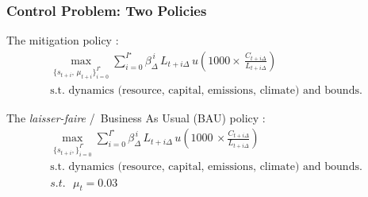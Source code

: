 \documentclass[xcolor=x11names,compress,aspectratio=169]{beamer}%
\makeatletter
\renewenvironment{itemize}{\begin{compactitemize}[<+-| alert@+>]}{\end{compactitemize}}
\makeatother
\begin{document}
\begin{frame}%
%

\frametitle{Control Problem: Two Policies}%


\begin{itemize}
\item The
\color{green}%
mitigation policy%
\color{black}%
:%
\begin{gather*}
\max_{\{s_{t+i},\,\mu_{t+i}\}_{i=0}^{I^{\star}}}\sum\nolimits_{i=0}^{I^{\star
}}\beta_{\Delta}^{\,i}\,L_{t+i\Delta}\,u\!\left(  1000\times\,\frac
{C_{t+i\Delta}}{L_{t+i\Delta}}\right)  \;\\
\text{s.t. dynamics (resource, capital, emissions, climate) and bounds.}%
\end{gather*}%
\vspace{1.5ex}%


\item The\textit{
\color{red}%
laisser-faire} /\ Business As Usual (BAU) policy%
\color{black}%
:%
\begin{gather*}
\max_{\{s_{t+i},\}_{i=0}^{I^{\star}}}\sum\nolimits_{i=0}^{I^{\star}}%
\beta_{\Delta}^{\,i}\,L_{t+i\Delta}\,u\!\left(  1000\,\times\frac
{C_{t+i\Delta}}{L_{t+i\Delta}}\right)  \;\\
\text{s.t. dynamics (resource, capital, emissions, climate) and bounds.}\\
s.t.\text{ }\mu_{t}=0.03
\end{gather*}

\end{itemize}

%

\transboxout
\end{frame}%
%
\end{document}
